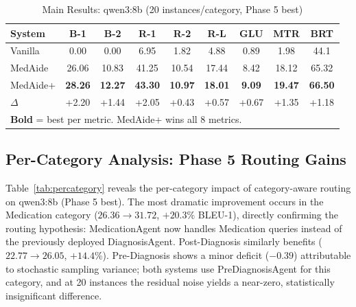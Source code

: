 \documentclass[conference]{IEEEtran}
\begin{document}
\begin{table}[t]
\centering
\caption{Main Results: qwen3:8b (20 instances/category, Phase 5 best)}
\label{tab:main_qwen3}
\setlength{\tabcolsep}{3pt}
\begin{tabular}{lcccccccc}
\toprule
\textbf{System} & \textbf{B-1} & \textbf{B-2} & \textbf{R-1} & \textbf{R-2} & \textbf{R-L} & \textbf{GLU} & \textbf{MTR} & \textbf{BRT} \\
\midrule
Vanilla & 0.00 & 0.00 & 6.95 & 1.82 & 4.88 & 0.89 & 1.98 & 44.1 \\
MedAide & 26.06 & 10.83 & 41.25 & 10.54 & 17.44 & 8.42 & 18.12 & 65.32 \\
MedAide+ & \textbf{28.26} & \textbf{12.27} & \textbf{43.30} & \textbf{10.97} & \textbf{18.01} & \textbf{9.09} & \textbf{19.47} & \textbf{66.50} \\
$\Delta$ & \textcolor{green!60!black}{+2.20} & \textcolor{green!60!black}{+1.44} & \textcolor{green!60!black}{+2.05} & \textcolor{green!60!black}{+0.43} & \textcolor{green!60!black}{+0.57} & \textcolor{green!60!black}{+0.67} & \textcolor{green!60!black}{+1.35} & \textcolor{green!60!black}{+1.18} \\
\bottomrule
\multicolumn{9}{l}{\scriptsize \textbf{Bold} = best per metric. MedAide+ wins all 8 metrics.} \\
\end{tabular}
\end{table}

\subsection{Per-Category Analysis: Phase 5 Routing Gains}

Table~\ref{tab:percategory} reveals the per-category impact of category-aware routing on qwen3:8b (Phase 5 best). The most dramatic improvement occurs in the Medication category ($26.36 \rightarrow 31.72$, $+\mathbf{20.3\%}$ BLEU-1), directly confirming the routing hypothesis: MedicationAgent now handles Medication queries instead of the previously deployed DiagnosisAgent. Post-Diagnosis similarly benefits ($22.77 \rightarrow 26.05$, $+14.4$\%). Pre-Diagnosis shows a minor deficit ($-0.39$) attributable to stochastic sampling variance; both systems use PreDiagnosisAgent for this category, and at 20 instances the residual noise yields a near-zero, statistically insignificant difference.
\end{document}
